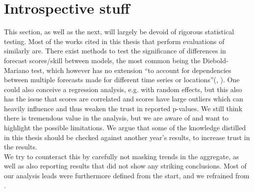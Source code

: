 \section{Introspective stuff}
This section, as well as the next, will largely be devoid of rigorous statistical testing. Most of the works cited in this thesis that perform evaluations of similarly are. There exist methods to test the significance of differences in forecast scores/skill between models, the most common being the Diebold-Mariano test, which however has no extension ``to account for dependencies between multiple forecasts made for different time series or locations''(\cite{bracher_evaluating_2021}, \cite{diebold_comparing_1995}). One could also conceive a regression analysis, e.g. with random effects, but this also has the issue that scores are correlated and scores have large outliers which can heavily influence and thus weaken the trust in reported p-values. We still think there is tremendous value in the analysis, but we are aware of and want to highlight the possible limitations. We argue that some of the knowledge distilled in this thesis should be checked against another year's results, to increase trust in the results.\\ 
We try to counteract this by carefully not masking trends in the aggregate, as well as also reporting results that did not show any striking conclusions. Most of our analysis leads were furthermore defined from the start, and we refrained from .\\
